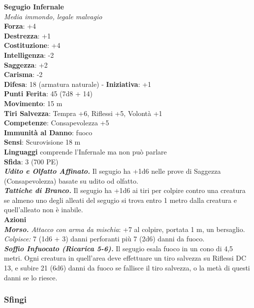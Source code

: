 \begin{multicols}{2}
\medskip\textbf{Segugio Infernale}\\
\emph{Media immondo, legale malvagio}\\
\textbf{Forza}: +4\\
\textbf{Destrezza}: +1\\
\textbf{Costituzione}: +4\\
\textbf{Intelligenza}: -2\\
\textbf{Saggezza}: +2\\
\textbf{Carisma}: -2\\
\textbf{Difesa}: 18 (armatura naturale) - \textbf{Iniziativa}: +1\\
\textbf{Punti Ferita}: 45 (7d8 + 14)\\
\textbf{Movimento}: 15 m\\
\textbf{Tiri Salvezza}: Tempra +6, Riflessi +5, Volontà +1\\
\textbf{Competenze}: Consapevolezza +5\\
\textbf{Immunità al Danno}: fuoco\\
\textbf{Sensi}: Scurovisione 18 m\\
\textbf{Linguaggi} comprende l'Infernale ma non può parlare\\
\textbf{Sfida}: 3 (700 PE)\smallskip\\
\emph{\textbf{Udito e Olfatto Affinato.}} Il segugio ha +1d6 nelle prove di Saggezza (Consapevolezza) basate su udito od olfatto.\\
\emph{\textbf{Tattiche di Branco.}} Il segugio ha +1d6 ai tiri per colpire contro una creatura se almeno uno degli alleati del segugio si trova entro 1 metro dalla creatura e quell'alleato non è inabile.\\
\smallskip\textbf{Azioni}\\
\emph{\textbf{Morso.} Attacco con arma da mischia}: +7 al colpire, portata 1 m, un bersaglio.\\
\emph{Colpisce:} 7 (1d6 + 3) danni perforanti più 7 (2d6) danni da fuoco.\\
\emph{\textbf{Soffio Infuocato (Ricarica 5-6).}} Il segugio esala fuoco in un cono di 4,5 metri. Ogni creatura in quell'area deve effettuare un tiro salvezza su Riflessi DC  13, e subire 21 (6d6) danni da fuoco se fallisce il tiro salvezza, o la metà di questi danni se lo riesce.\\

\subsubsection{Sfingi}


\end{multicols}
